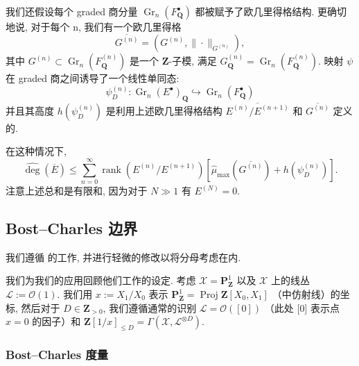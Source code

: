 我们还假设每个 graded 商分量 \(\operatorname{Gr}_n(F_{\mathbf{Q}}^{\bullet})\) 都被赋予了欧几里得格结构. 
更确切地说, 对于每个 n, 我们有一个欧几里得格
\[ \overline{G^{(n)}} = \left(G^{(n)}, \|\cdot\|_{G^{(n)}}\right), \]
其中 \(G^{(n)} \subset \operatorname{Gr}_n(F_{\mathbf{Q}}^{(n)})\) 是一个 \(\mathbf{Z}\)-子模, 
满足 \(G_{\mathbf{Q}}^{(n)} = \operatorname{Gr}_n(F_{\mathbf{Q}}^{(n)})\). 
映射 \(\psi\) 在 graded 商之间诱导了一个线性单同态:
\begin{equation}\label{eq:7.2.12}
\psi_D^{(n)}: \operatorname{Gr}_n(E^{\bullet})_{\mathbf{Q}} \hookrightarrow \operatorname{Gr}_n(F_{\mathbf{Q}}^{\bullet})
\end{equation}
并且其高度 \(h(\psi_D^{(n)})\) 是利用上述欧几里得格结构 \(\overline{E^{(n)}/E^{(n+1)}}\) 
和 \(\overline{G^{(n)}}\) 定义的.

\begin{lemma}\label{lem:7.2.13}
在这种情况下,
\begin{equation}\label{eq:7.2.14}
\widehat{\operatorname{deg}}(\overline{E}) \leq \sum_{n=0}^{\infty} \operatorname{rank}(E^{(n)}/E^{(n+1)}) \left[\widehat{\mu}_{\max}(\overline{G^{(n)}}) + h(\psi_D^{(n)})\right].
\end{equation}
注意上述总和是有限和, 因为对于 \(N \gg 1\) 有 \(E^{(N)} = 0\).
\end{lemma}

\subsection{Bost--Charles 边界}\label{sec:7.3}

我们遵循 \cite{Bos20}\cite{BC22} 的工作, 并进行轻微的修改以将分母考虑在内.

我们为我们的应用回顾他们工作的设定. 
考虑 \(\mathcal{X} = \mathbf{P}_{\mathbf{Z}}^1\) 以及 \(\mathcal{X}\) 上的线丛 \(\mathcal{L} := \mathcal{O}(1)\). 
我们用 \(x := X_1/X_0\) 表示 \(\mathbf{P}_{\mathbf{Z}}^1 = \operatorname{Proj} \mathbf{Z}[X_0, X_1]\) （中仿射线）的坐标, 
然后对于 \(D \in \mathbf{Z}_{>0}\), 我们遵循通常的识别 \(\mathcal{L} = \mathcal{O}([0])\) （此处 [0] 表示点 \(x = 0\) 的因子）和 \(\mathbf{Z}[1/x]_{\leq D} = \Gamma(\mathcal{X}, \mathcal{L}^{\otimes D})\).

\subsubsection{Bost--Charles 度量}\label{sec:7.3.1}

